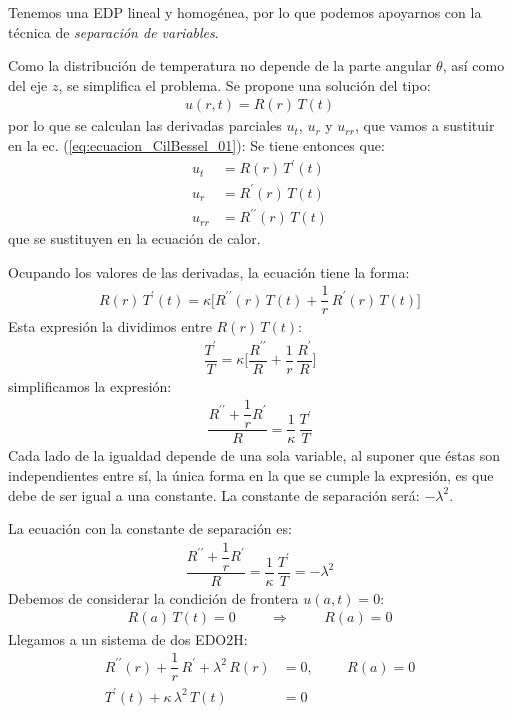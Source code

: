 \documentclass[12pt]{article}
\newcommand{\pderivada}[1]{\ensuremath{{#1}^{\prime}}}
\newcommand{\sderivada}[1]{\ensuremath{{#1}^{\prime \prime}}}
\numberwithin{equation}{section}
\begin{document}
Tenemos una EDP lineal y homogénea, por lo que podemos apoyarnos con la técnica de \emph{separación de variables}.
\par
Como la distribución de temperatura no depende  de la parte angular $\theta$, así como del eje $z$, se simplifica el problema. Se propone una solución del tipo:
\begin{align*}
u (r, t) = R (r) \, T (t)
\end{align*}
por lo que se calculan las derivadas parciales $u_{t}$, $u_{r}$ y $u_{rr}$, que vamos a sustituir en la ec. (\ref{eq:ecuacion_CilBessel_01}):
Se tiene entonces que:
\begin{align*}
u_{t} &= R (r) \, \pderivada{T} (t) \\[0.5em] 
u_{r} &= \pderivada{R} (r) \, {T} (t) \\[0.5em] 
u_{rr} &= \sderivada{R} (r) \, {T} (t)
\end{align*}
que se sustituyen en la ecuación de calor.
\par
Ocupando los valores de las derivadas, la ecuación tiene la forma:
\begin{align*}
R (r) \, \pderivada{T} (t) = \kappa \bigg[ \sderivada{R} (r) \, {T} (t) + \dfrac{1}{r} \, \pderivada{R} (r) \, {T}(t) \bigg]
\end{align*}
Esta expresión la dividimos entre $R (r) \, T (t)$:
\begin{align*}
\dfrac{\pderivada{T}}{T} = \kappa \bigg[ \dfrac{\sderivada{R}}{R} + \dfrac{1}{r} \, \dfrac{\pderivada{R}}{R} \bigg]
\end{align*}
simplificamos la expresión:
\begin{align*}
\dfrac{\sderivada{R} + \dfrac{1}{r} \pderivada{R}}{R} = \dfrac{1}{\kappa} \, \dfrac{\pderivada{T}}{T}
\end{align*}
Cada lado de la igualdad depende de una sola variable, al suponer que éstas son independientes entre sí, la única forma en la que se cumple la expresión, es que debe de ser igual a una constante. La constante de separación será: $-\lambda^{2}$.
\par
La ecuación con la constante de separación es:
\begin{align*}
\dfrac{\sderivada{R} + \dfrac{1}{r} \pderivada{R}}{R} = \dfrac{1}{\kappa} \, \dfrac{\pderivada{T}}{T} = -\lambda^{2}
\end{align*}
Debemos de considerar la condición de frontera $u (a, t) = 0$:
\begin{align*}
R (a) \, T (t) = 0 \hspace{1cm} \Rightarrow \hspace{1cm} R (a) = 0
\end{align*}
Llegamos a un sistema de dos EDO2H:
\begin{align}
\sderivada{R} (r) + \dfrac{1}{r} \, \pderivada{R} + \lambda^{2} \, R (r) &= 0, \hspace{1cm} R (a) = 0 \label{eq:ecuacion_CilBessel_03} \\[0.5em]  
\pderivada{T} (t) + \kappa \, \lambda^{2} \, T (t) &= 0 \label{eq:ecuacion_CilBessel_04}
\end{align}
\end{document}
